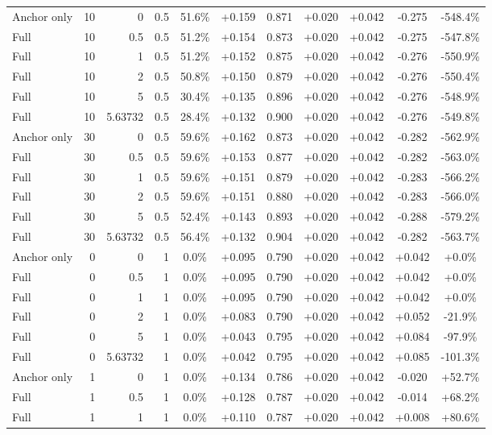 \begin{table}[htbp]
\begin{tabular}{lrrrccccccc}
Anchor only & 10 & 0 & 0.5 & 51.6\% & +0.159 & 0.871 & +0.020 & +0.042 & -0.275 & -548.4\% \\
Full & 10 & 0.5 & 0.5 & 51.2\% & +0.154 & 0.873 & +0.020 & +0.042 & -0.275 & -547.8\% \\
Full & 10 & 1 & 0.5 & 51.2\% & +0.152 & 0.875 & +0.020 & +0.042 & -0.276 & -550.9\% \\
Full & 10 & 2 & 0.5 & 50.8\% & +0.150 & 0.879 & +0.020 & +0.042 & -0.276 & -550.4\% \\
Full & 10 & 5 & 0.5 & 30.4\% & +0.135 & 0.896 & +0.020 & +0.042 & -0.276 & -548.9\% \\
Full & 10 & 5.63732 & 0.5 & 28.4\% & +0.132 & 0.900 & +0.020 & +0.042 & -0.276 & -549.8\% \\
Anchor only & 30 & 0 & 0.5 & 59.6\% & +0.162 & 0.873 & +0.020 & +0.042 & -0.282 & -562.9\% \\
Full & 30 & 0.5 & 0.5 & 59.6\% & +0.153 & 0.877 & +0.020 & +0.042 & -0.282 & -563.0\% \\
Full & 30 & 1 & 0.5 & 59.6\% & +0.151 & 0.879 & +0.020 & +0.042 & -0.283 & -566.2\% \\
Full & 30 & 2 & 0.5 & 59.6\% & +0.151 & 0.880 & +0.020 & +0.042 & -0.283 & -566.0\% \\
Full & 30 & 5 & 0.5 & 52.4\% & +0.143 & 0.893 & +0.020 & +0.042 & -0.288 & -579.2\% \\
Full & 30 & 5.63732 & 0.5 & 56.4\% & +0.132 & 0.904 & +0.020 & +0.042 & -0.282 & -563.7\% \\
Anchor only & 0 & 0 & 1 & 0.0\% & +0.095 & 0.790 & +0.020 & +0.042 & +0.042 & +0.0\% \\
Full & 0 & 0.5 & 1 & 0.0\% & +0.095 & 0.790 & +0.020 & +0.042 & +0.042 & +0.0\% \\
Full & 0 & 1 & 1 & 0.0\% & +0.095 & 0.790 & +0.020 & +0.042 & +0.042 & +0.0\% \\
Full & 0 & 2 & 1 & 0.0\% & +0.083 & 0.790 & +0.020 & +0.042 & +0.052 & -21.9\% \\
Full & 0 & 5 & 1 & 0.0\% & +0.043 & 0.795 & +0.020 & +0.042 & +0.084 & -97.9\% \\
Full & 0 & 5.63732 & 1 & 0.0\% & +0.042 & 0.795 & +0.020 & +0.042 & +0.085 & -101.3\% \\
Anchor only & 1 & 0 & 1 & 0.0\% & +0.134 & 0.786 & +0.020 & +0.042 & -0.020 & +52.7\% \\
Full & 1 & 0.5 & 1 & 0.0\% & +0.128 & 0.787 & +0.020 & +0.042 & -0.014 & +68.2\% \\
Full & 1 & 1 & 1 & 0.0\% & +0.110 & 0.787 & +0.020 & +0.042 & +0.008 & +80.6\% \\

\end{tabular}
\end{table}

